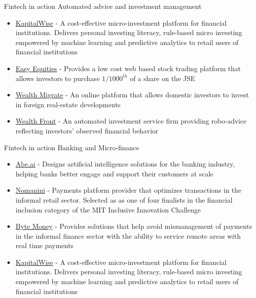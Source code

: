 \documentclass[9pt]{beamer}
\begin{document}

\begin{frame}{Fintech in action}
	Automated advice and investment management
	\begin{itemize}
		\item \href{www.kapitalwise.com/}{KapitalWise} - A cost-effective micro-investment platform for financial institutions. Delivers personal investing literacy, rule-based micro investing empowered by machine learning and predictive analytics to retail users of financial institutions
		\item \href{https://www.easyequities.co.za}{Easy Equities} - Provides a low cost web based stock trading platform that allows investors to purchase $1/1000^{th}$ of a share on the JSE
		\item \href{https://www.wealthmigrate.com/za}{Wealth Migrate} - An online platform that allows domestic investors to invest in foreign real-estate developments
		\item \href{https://www.wealthfront.com}{Wealth Front} - An automated investment service firm providing robo-advice reflecting investors' observed financial behavior
	\end{itemize}
\end{frame}


\begin{frame}{Fintech in action}
	Banking and Micro-finance
	\begin{itemize}
		\item \href{https://www.abe.ai/}{Abe.ai} - Designs artificial intelligence solutions for the banking industry, helping banks better engage and support their customers at scale
		\item \href{https://www.nomanini.com/}{Nomanini} - Payments platform provider that optimizes transactions in the informal retail sector. Selected as as one of four finalists in the financial inclusion category of the MIT Inclusive Innovation Challenge
		\item\href{www.bytemoney.co.za/}{Byte Money} - Provides solutions that help avoid mismanagement of payments in the informal finance sector with the ability to service remote areas with real time payments
		\item \href{www.kapitalwise.com/}{KapitalWise} - A cost-effective micro-investment platform for financial institutions. Delivers personal investing literacy, rule-based micro investing empowered by machine learning and predictive analytics to retail users of financial institutions
	\end{itemize}
\end{frame}
\end{document}
